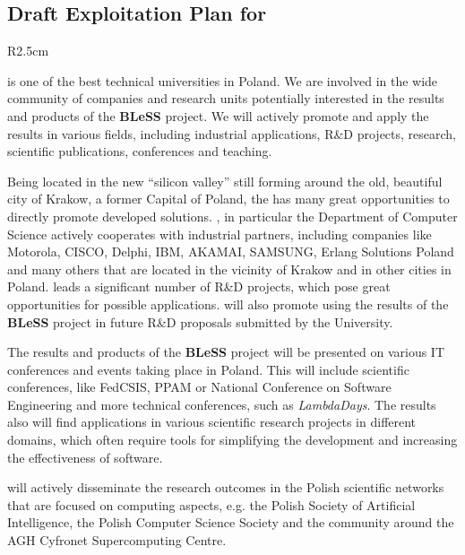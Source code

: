 \documentclass[a4paper,11pt]{article}
\newcommand{\project}[1]{\textbf{#1}\xspace}
\newcommand{\BLESS}{\project{BLeSS}}
\newcommand{\TheProject}{\BLESS}
\begin{document}
\horizontalline

\subsection*{Draft Exploitation Plan for \AGHshort{}}
\vspace{-6pt}

\begin{wrapfigure}{R}{2.5cm}
\vspace{-1.45cm}
\hfill {}
\vspace{-0.4cm}
\end{wrapfigure} 


\AGHlong is one of the best technical universities in Poland. We are involved
in the wide community of companies and research units potentially
interested in the results and products of the \TheProject{} project. We will
actively promote and apply the results in various fields, including
industrial applications, R\&D projects, research, scientific
publications, conferences and teaching.

Being located in the new ``silicon valley'' still forming around the old,
beautiful city of Krakow, a former Capital of Poland, the \AGHlong{} has
many great opportunities to directly promote developed
solutions. \AGHshort{}, in particular the Department of Computer Science
actively cooperates with industrial partners, including companies like
Motorola, CISCO, Delphi, IBM, AKAMAI, SAMSUNG, Erlang Solutions Poland
and many others that are located in the vicinity of Krakow and in other cities in
Poland. \AGHshort{} leads a significant number of R\&D projects, which
pose great opportunities for possible applications. \AGHshort{} will also
promote using the results of the \TheProject project in future R\&D
proposals submitted by the University.

The results and products of the \TheProject{} project will be presented on various IT
conferences and events taking place in Poland. This will include
scientific conferences, like FedCSIS, PPAM or National Conference on
Software Engineering and more technical conferences, such as \emph{LambdaDays}. The
results also will find applications in various scientific research
projects in different domains, which often require tools for simplifying
the development and increasing the effectiveness of software.

\AGHshort{} will actively disseminate the research outcomes in the Polish
scientific networks that are focused on computing aspects, e.g. the Polish Society of
Artificial Intelligence, the Polish Computer Science Society and the
community around the AGH Cyfronet Supercomputing Centre.
\end{document}
